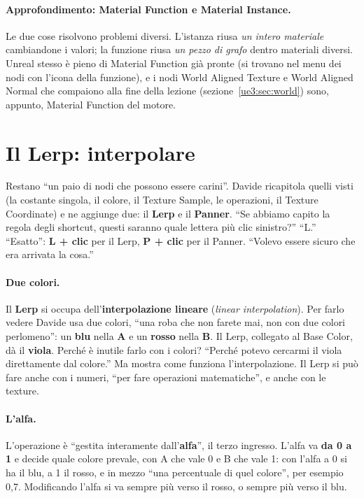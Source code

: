 \paragraph{Approfondimento: Material Function e Material Instance.} Le due cose
risolvono problemi diversi. L'istanza riusa \emph{un intero materiale} cambiandone i
valori; la funzione riusa \emph{un pezzo di grafo} dentro materiali diversi. Unreal
stesso è pieno di Material Function già pronte (si trovano nel menu dei nodi con
l'icona della funzione), e i nodi World Aligned Texture e World Aligned Normal che
compaiono alla fine della lezione (sezione~\ref{ue3:sec:world}) sono, appunto, Material
Function del motore.

\section{Il Lerp: interpolare}
\label{ue3:sec:lerp}

Restano ``un paio di nodi che possono essere carini''. Davide ricapitola quelli visti
(la costante singola, il colore, il Texture Sample, le operazioni, il Texture
Coordinate) e ne aggiunge due: il \textbf{Lerp} e il \textbf{Panner}. ``Se abbiamo
capito la regola degli shortcut, questi saranno quale lettera più clic sinistro?''
``L.'' ``Esatto'': \textbf{L + clic} per il Lerp, \textbf{P + clic} per il Panner. ``Volevo
essere sicuro che era arrivata la cosa.''

\paragraph{Due colori.} Il \textbf{Lerp} si occupa dell'\textbf{interpolazione
lineare} (\emph{linear interpolation}). Per farlo vedere Davide usa due colori, ``una
roba che non farete mai, non con due colori perlomeno'': un \textbf{blu} nella
\textbf{A} e un \textbf{rosso} nella \textbf{B}. Il Lerp, collegato al Base Color, dà il
\textbf{viola}. Perché è inutile farlo con i colori? ``Perché potevo cercarmi il viola
direttamente dal colore.'' Ma mostra come funziona l'interpolazione. Il Lerp si può fare
anche con i numeri, ``per fare operazioni matematiche'', e anche con le texture.

\paragraph{L'alfa.} L'operazione è ``gestita interamente dall'\textbf{alfa}'', il terzo
ingresso. L'alfa va \textbf{da 0 a 1} e decide quale colore prevale, con A che vale 0 e
B che vale 1: con l'alfa a 0 si ha il blu, a 1 il rosso, e in mezzo ``una percentuale di
quel colore'', per esempio 0,7. Modificando l'alfa si va sempre più verso il rosso, o
sempre più verso il blu.

